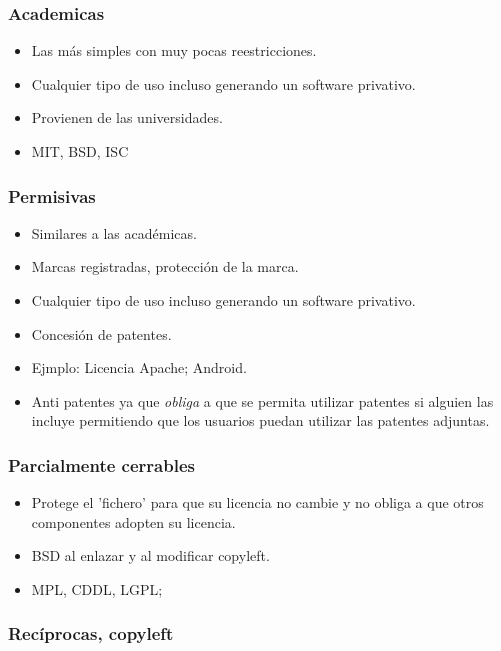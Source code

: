 \documentclass[11pt]{scrartcl}
\begin{document}
\subsubsection{Academicas}

\begin{itemize}
	\item Las m\'as simples con muy pocas reestricciones.
	\item Cualquier tipo de uso incluso generando un software privativo.
	\item Provienen de las universidades.
	\item MIT, BSD, ISC
\end{itemize}	

\subsubsection{Permisivas}

\begin{itemize}
	\item Similares a las acad\'emicas.
	\item Marcas registradas, protecci\'on de la marca.
	\item Cualquier tipo de uso incluso generando un software privativo.
	\item Concesi\'on de patentes.
	\item Ejmplo: Licencia Apache; Android.
	\item Anti patentes ya que \emph{obliga} a que se permita utilizar patentes si alguien las incluye permitiendo que los usuarios puedan utilizar las patentes adjuntas.
\end{itemize}

\subsubsection{Parcialmente cerrables}

\begin{itemize}
	\item Protege el 'fichero' para que su licencia no cambie y no obliga a que otros componentes adopten su licencia.
	\item BSD al enlazar y al modificar copyleft.
	\item MPL, CDDL, LGPL; 
\end{itemize}

\subsubsection{Rec\'iprocas, copyleft}
\end{document}

